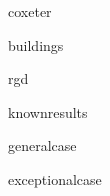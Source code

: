\documentclass[12 pt,oneside]{book}
\begin{document}
{coxeter}

{buildings}

{rgd}

{knownresults}

{generalcase}

{exceptionalcase}



\end{document}
